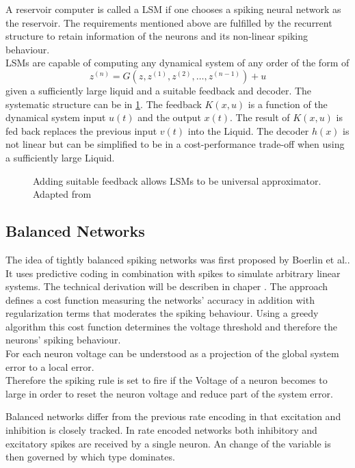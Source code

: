 A reservoir computer is called a \ac{LSM} if one chooses a spiking neural network as the reservoir. The requirements mentioned above are fulfilled by the recurrent structure to retain information of the neurons and its non-linear spiking behaviour.\\
\acp{LSM} are capable of computing any dynamical system of any order of the form of
\begin{equation}
	z^{(n)} = G(z,z^{(1)},z^{(2)},\dots,z^{(n-1)}) + u
\end{equation}
given a sufficiently large liquid and a suitable feedback and decoder\cite{maass_computational_2004}. The systematic structure can be in \cref{fig:LSM_feedback}. The feedback $K(x,u)$ is a function of the dynamical system input $u(t)$ and the output $x(t)$. The result of $K(x,u)$ is fed back replaces the previous input $v(t)$ into the Liquid. The decoder $h(x)$ is not linear but can be simplified to be in a cost-performance trade-off when using a sufficiently large Liquid.\\
\begin{figure}[htbp]
	\centering
	
	\caption{Adding suitable feedback allows \acp{LSM} to be universal approximator. Adapted from \cite{maass_computational_2007}}
	\label{fig:LSM_feedback}
\end{figure}


\subsection{Balanced Networks}
The idea of tightly balanced spiking networks was first proposed by Boerlin et al.\cite{boerlin_predictive_2013}. It uses predictive coding in combination with spikes to simulate arbitrary linear systems.
The technical derivation will be describen in chaper . The approach defines a cost function measuring the networks' accuracy in addition with regularization terms that moderates the spiking behaviour. Using a greedy algorithm this cost function determines the voltage threshold and therefore the neurons' spiking behaviour.\\
For each neuron voltage can be understood as a projection of the global system error to a local error.\\
Therefore the spiking rule is set to fire if the Voltage of a neuron becomes to large in order to reset the neuron voltage and reduce part of the system error.


Balanced networks differ from the previous rate encoding in that excitation and inhibition is closely tracked. In rate encoded networks both inhibitory and excitatory spikes are received by a single neuron. An change of the variable is then governed by which type dominates.


